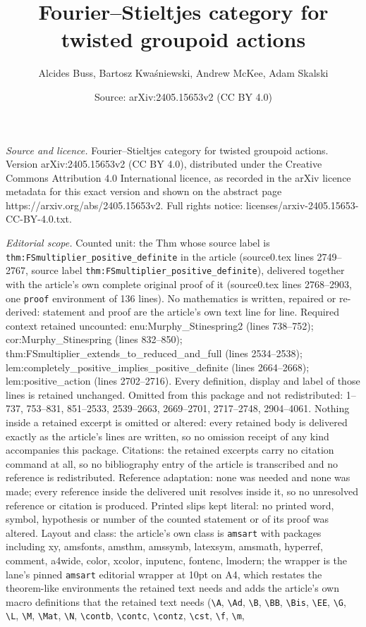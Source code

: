\documentclass[10pt,a4paper]{amsart}
\title[Fourier--Stieltjes category for twisted groupoid actions]{Fourier--Stieltjes category for twisted groupoid actions}
\author{Alcides Buss, Bartosz Kwa\'sniewski, Andrew McKee, Adam Skalski}
\date{Source: arXiv:2405.15653v2 (CC BY 4.0)}
\begin{document}
\maketitle

\noindent\emph{Source and licence.} Fourier--Stieltjes category for twisted groupoid actions. Version arXiv:2405.15653v2 (CC BY 4.0), distributed under the Creative Commons Attribution 4.0 International licence, as recorded in the arXiv licence metadata for this exact version and shown on the abstract page https://arxiv.org/abs/2405.15653v2. Full rights notice: licenses/arxiv-2405.15653-CC-BY-4.0.txt.\par\smallskip

\noindent\textit{Editorial scope.} Counted unit: the Thm whose source label is \texttt{thm:FSmultiplier\_positive\_definite} in the article (source0.tex lines 2749--2767, source label \texttt{thm:FSmultiplier\_positive\_definite}), delivered together with the article's own complete original proof of it (source0.tex lines 2768--2903, one \texttt{proof} environment of 136 lines). No mathematics is written, repaired or re-derived: statement and proof are the article's own text line for line. Required context retained uncounted: enu:Murphy\_Stinespring2 (lines 738--752); cor:Murphy\_Stinespring (lines 832--850); thm:FSmultiplier\_extends\_to\_reduced\_and\_full (lines 2534--2538); lem:completely\_positive\_implies\_positive\_definite (lines 2664--2668); lem:positive\_action (lines 2702--2716). Every definition, display and label of those lines is retained unchanged. Omitted from this package and not redistributed: 1--737, 753--831, 851--2533, 2539--2663, 2669--2701, 2717--2748, 2904--4061. Nothing inside a retained excerpt is omitted or altered: every retained body is delivered exactly as the article's lines are written, so no omission receipt of any kind accompanies this package. Citations: the retained excerpts carry no citation command at all, so no bibliography entry of the article is transcribed and no reference is redistributed. Reference adaptation: none was needed and none was made; every reference inside the delivered unit resolves inside it, so no unresolved reference or citation is produced. Printed slips kept literal: no printed word, symbol, hypothesis or number of the counted statement or of its proof was altered. Layout and class: the article's own class is \texttt{amsart} with packages including xy, amsfonts, amsthm, amssymb, latexsym, amsmath, hyperref, comment, a4wide, color, xcolor, inputenc, fontenc, lmodern; the wrapper is the lane's pinned \texttt{amsart} editorial wrapper at 10pt on A4, which restates the theorem-like environments the retained text needs and adds the article's own macro definitions that the retained text needs (\texttt{\textbackslash A}, \texttt{\textbackslash Ad}, \texttt{\textbackslash B}, \texttt{\textbackslash BB}, \texttt{\textbackslash Bis}, \texttt{\textbackslash EE}, \texttt{\textbackslash G}, \texttt{\textbackslash L}, \texttt{\textbackslash M}, \texttt{\textbackslash Mat}, \texttt{\textbackslash N}, \texttt{\textbackslash contb}, \texttt{\textbackslash contc}, \texttt{\textbackslash contz}, \texttt{\textbackslash cst}, \texttt{\textbackslash f}, \texttt{\textbackslash m}, 
\end{document}
